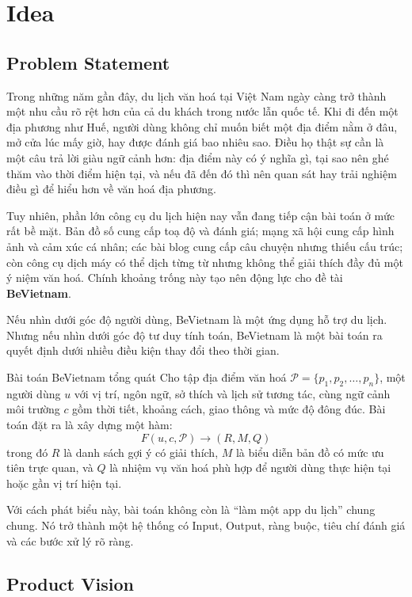\section{Idea}

\subsection{Problem Statement}

Trong những năm gần đây, du lịch văn hoá tại Việt Nam ngày càng trở thành một nhu cầu rõ rệt hơn của cả du khách trong nước lẫn quốc tế. Khi đi đến một địa phương như Huế, người dùng không chỉ muốn biết một địa điểm nằm ở đâu, mở cửa lúc mấy giờ, hay được đánh giá bao nhiêu sao. Điều họ thật sự cần là một câu trả lời giàu ngữ cảnh hơn: địa điểm này có ý nghĩa gì, tại sao nên ghé thăm vào thời điểm hiện tại, và nếu đã đến đó thì nên quan sát hay trải nghiệm điều gì để hiểu hơn về văn hoá địa phương.

Tuy nhiên, phần lớn công cụ du lịch hiện nay vẫn đang tiếp cận bài toán ở mức rất bề mặt. Bản đồ số cung cấp toạ độ và đánh giá; mạng xã hội cung cấp hình ảnh và cảm xúc cá nhân; các bài blog cung cấp câu chuyện nhưng thiếu cấu trúc; còn công cụ dịch máy có thể dịch từng từ nhưng không thể giải thích đầy đủ một ý niệm văn hoá. Chính khoảng trống này tạo nên động lực cho đề tài \textbf{BeVietnam}.

Nếu nhìn dưới góc độ người dùng, BeVietnam là một ứng dụng hỗ trợ du lịch. Nhưng nếu nhìn dưới góc độ tư duy tính toán, BeVietnam là một bài toán ra quyết định dưới nhiều điều kiện thay đổi theo thời gian.

\begin{mydef}{Bài toán BeVietnam tổng quát}{}
Cho tập địa điểm văn hoá $\mathcal{P} = \{p_1,p_2,\ldots,p_n\}$, một người dùng $u$ với vị trí, ngôn ngữ, sở thích và lịch sử tương tác, cùng ngữ cảnh môi trường $c$ gồm thời tiết, khoảng cách, giao thông và mức độ đông đúc. Bài toán đặt ra là xây dựng một hàm:
\[
    F(u,c,\mathcal{P}) \rightarrow (R, M, Q)
\]
trong đó $R$ là danh sách gợi ý có giải thích, $M$ là biểu diễn bản đồ có mức ưu tiên trực quan, và $Q$ là nhiệm vụ văn hoá phù hợp để người dùng thực hiện tại hoặc gần vị trí hiện tại.
\end{mydef}

Với cách phát biểu này, bài toán không còn là ``làm một app du lịch'' chung chung. Nó trở thành một hệ thống có Input, Output, ràng buộc, tiêu chí đánh giá và các bước xử lý rõ ràng.

\subsection{Product Vision}


